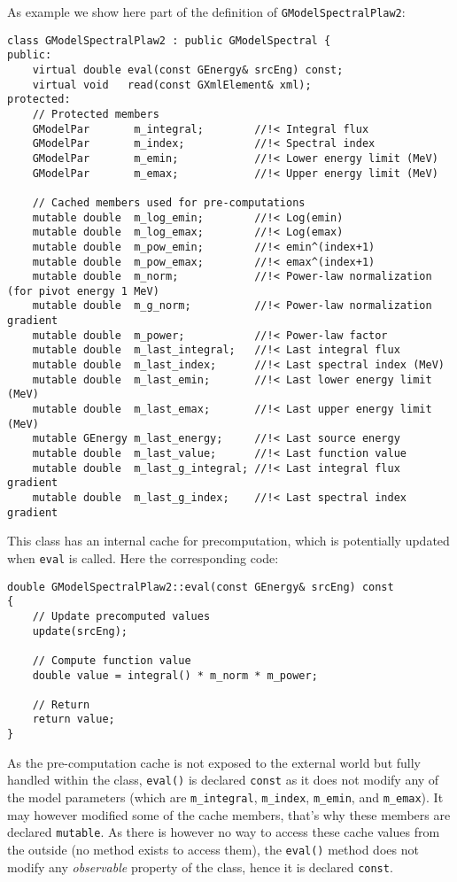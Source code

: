 \documentclass{article}[12pt,a4]
\begin{document}
As example we show here part of the definition of {\tt GModelSpectralPlaw2}:
\begin{verbatim}
class GModelSpectralPlaw2 : public GModelSpectral {
public:
    virtual double eval(const GEnergy& srcEng) const;
    virtual void   read(const GXmlElement& xml);
protected:
    // Protected members
    GModelPar       m_integral;        //!< Integral flux
    GModelPar       m_index;           //!< Spectral index
    GModelPar       m_emin;            //!< Lower energy limit (MeV)
    GModelPar       m_emax;            //!< Upper energy limit (MeV)

    // Cached members used for pre-computations
    mutable double  m_log_emin;        //!< Log(emin)
    mutable double  m_log_emax;        //!< Log(emax)
    mutable double  m_pow_emin;        //!< emin^(index+1)
    mutable double  m_pow_emax;        //!< emax^(index+1)
    mutable double  m_norm;            //!< Power-law normalization (for pivot energy 1 MeV)
    mutable double  m_g_norm;          //!< Power-law normalization gradient
    mutable double  m_power;           //!< Power-law factor
    mutable double  m_last_integral;   //!< Last integral flux
    mutable double  m_last_index;      //!< Last spectral index (MeV)
    mutable double  m_last_emin;       //!< Last lower energy limit (MeV)
    mutable double  m_last_emax;       //!< Last upper energy limit (MeV)
    mutable GEnergy m_last_energy;     //!< Last source energy
    mutable double  m_last_value;      //!< Last function value
    mutable double  m_last_g_integral; //!< Last integral flux gradient
    mutable double  m_last_g_index;    //!< Last spectral index gradient
\end{verbatim}
This class has an internal cache for precomputation, which is potentially updated when
{\tt eval} is called.
Here the corresponding code:
\begin{verbatim}
double GModelSpectralPlaw2::eval(const GEnergy& srcEng) const
{
    // Update precomputed values
    update(srcEng);

    // Compute function value
    double value = integral() * m_norm * m_power;

    // Return
    return value;
}
\end{verbatim}
As the pre-computation cache is not exposed to the external world but fully handled within
the class, {\tt eval()} is declared {\tt const} as it does not modify any of the model parameters
(which are {\tt m\_integral}, {\tt m\_index}, {\tt m\_emin}, and {\tt m\_emax}).
It may however modified some of the cache members, that's why these members are
declared {\tt mutable}.
As there is however no way to access these cache values from the outside (no method exists
to access them), the {\tt eval()} method does not modify any {\em observable} property of the class,
hence it is declared {\tt const}.
\end{document}
